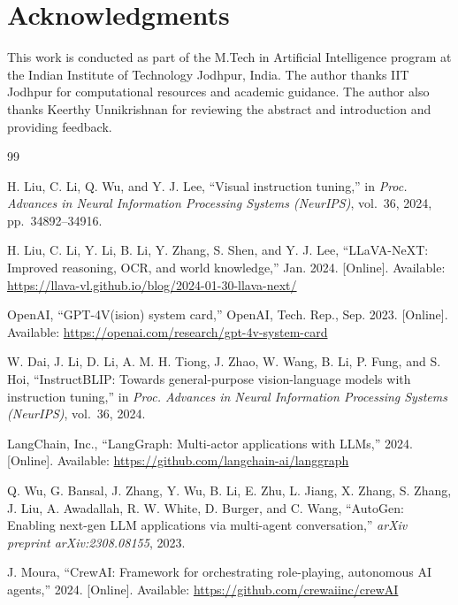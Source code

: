 \documentclass[conference]{IEEEtran}
\begin{document}
\section*{Acknowledgments}

This work is conducted as part of the M.Tech in Artificial Intelligence program at the Indian Institute of Technology Jodhpur, India.
The author thanks IIT Jodhpur for computational resources and academic guidance.
The author also thanks Keerthy Unnikrishnan for reviewing the abstract and introduction and providing feedback.


\balance
\begin{thebibliography}{99}

H. Liu, C. Li, Q. Wu, and Y. J. Lee, ``Visual instruction tuning,'' in \textit{Proc. Advances in Neural Information Processing Systems (NeurIPS)}, vol.~36, 2024, pp.~34892--34916.

H. Liu, C. Li, Y. Li, B. Li, Y. Zhang, S. Shen, and Y. J. Lee, ``LLaVA-NeXT: Improved reasoning, OCR, and world knowledge,'' Jan. 2024. [Online]. Available: \url{https://llava-vl.github.io/blog/2024-01-30-llava-next/}

OpenAI, ``GPT-4V(ision) system card,'' OpenAI, Tech. Rep., Sep. 2023. [Online]. Available: \url{https://openai.com/research/gpt-4v-system-card}

W. Dai, J. Li, D. Li, A. M. H. Tiong, J. Zhao, W. Wang, B. Li, P. Fung, and S. Hoi, ``InstructBLIP: Towards general-purpose vision-language models with instruction tuning,'' in \textit{Proc. Advances in Neural Information Processing Systems (NeurIPS)}, vol.~36, 2024.

LangChain, Inc., ``LangGraph: Multi-actor applications with LLMs,'' 2024. [Online]. Available: \url{https://github.com/langchain-ai/langgraph}

Q. Wu, G. Bansal, J. Zhang, Y. Wu, B. Li, E. Zhu, L. Jiang, X. Zhang, S. Zhang, J. Liu, A. Awadallah, R. W. White, D. Burger, and C. Wang, ``AutoGen: Enabling next-gen LLM applications via multi-agent conversation,'' \textit{arXiv preprint arXiv:2308.08155}, 2023.

J. Moura, ``CrewAI: Framework for orchestrating role-playing, autonomous AI agents,'' 2024. [Online]. Available: \url{https://github.com/crewaiinc/crewAI}


\end{thebibliography}
\end{document}
